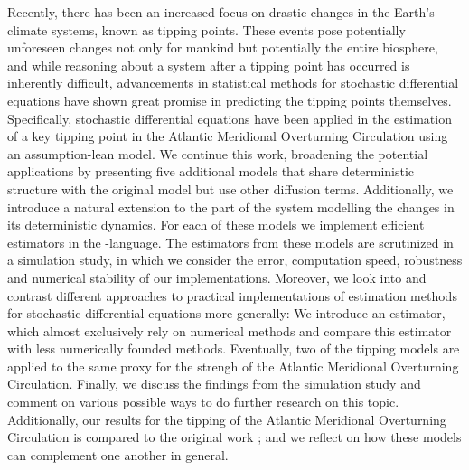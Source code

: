 \noindent Recently, there has been an increased focus on drastic changes in the Earth's climate systems, known as tipping points. These events pose potentially unforeseen changes not only for mankind but potentially the entire biosphere, and while reasoning about a system after a tipping point has occurred is inherently difficult, advancements in statistical methods for stochastic differential equations \cite{SplittingSchemes} have shown great promise in predicting the tipping points themselves. Specifically, stochastic differential equations have been applied in the estimation of a key tipping point in the Atlantic Meridional Overturning Circulation \cite{Ditlevsen2023} using an assumption-lean model.  We continue this work, broadening the potential applications by presenting five additional models that share deterministic structure with the original model but use other diffusion terms. Additionally, we introduce a natural extension to the part of the system modelling the changes in its deterministic dynamics. For each of these models we implement efficient estimators in the -language\cite{Rlang}. The estimators from these models are scrutinized in a simulation study, in which we consider the error, computation speed, robustness and numerical stability of our implementations. Moreover, we look into and contrast different approaches to practical implementations of estimation methods for stochastic differential equations more generally: We introduce an estimator, which almost exclusively rely on numerical methods and compare this estimator with less numerically founded methods. Eventually, two of the tipping models are applied to the same proxy for the strengh of the Atlantic Meridional Overturning Circulation. Finally, we discuss the findings from the simulation study and comment on various possible ways to do further research on this topic. Additionally, our results for the tipping of the Atlantic Meridional Overturning Circulation is compared to the original work \cite{Ditlevsen2023}; and we reflect on how these models can complement one another in general.